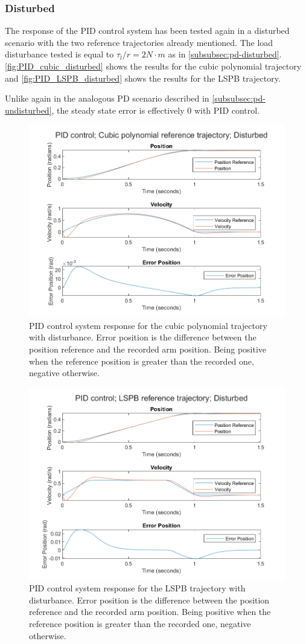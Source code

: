 \subsubsection{Disturbed}
The response of the PID control system has been tested again in a disturbed
scenario with the two reference trajectories already mentioned. The load
disturbance tested is equal to $\tau_l/r = 2 N\cdot m$ as in
\autoref{subsubsec:pd-disturbed}. \autoref{fig:PID_cubic_disturbed} shows the
results for the cubic polynomial trajectory and
\autoref{fig:PID_LSPB_disturbed} shows the results for the LSPB trajectory.

Unlike again in the analogous PD scenario described in
\autoref{subsubsec:pd-undisturbed}, the steady state error is effectively $0$
with PID control.

\begin{figure}[h]
    \centering
    \includegraphics[width=.7\textwidth]{PID_cubic_disturbed.png}
    \caption{PID control system response for the cubic polynomial trajectory
    with disturbance. Error position is the difference between the position reference and the recorded arm position. Being positive when the reference position is greater than the recorded one, negative otherwise.}
    \label{fig:PID_cubic_disturbed}
\end{figure}

\begin{figure}[h]
    \centering
    \includegraphics[width=.7\textwidth]{PID_LSPB_disturbed.png}
    \caption{PID control system response for the LSPB trajectory with disturbance. Error position is the difference between the position reference and the recorded arm position. Being positive when the reference position is greater than the recorded one, negative otherwise.}
    \label{fig:PID_LSPB_disturbed}
\end{figure}

